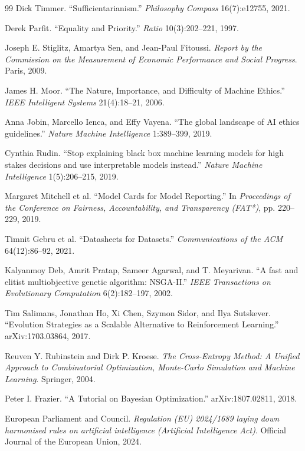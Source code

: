\documentclass[11pt,a4paper]{article}
\begin{document}
\begin{thebibliography}{99}
 Dick Timmer. ``Sufficientarianism.'' \emph{Philosophy
Compass} 16(7):e12755, 2021.

 Derek Parfit. ``Equality and Priority.'' \emph{Ratio}
10(3):202--221, 1997.

 Joseph E. Stiglitz, Amartya Sen, and Jean-Paul
Fitoussi. \emph{Report by the Commission on the Measurement of Economic
Performance and Social Progress}. Paris, 2009.

 James H. Moor. ``The Nature, Importance, and Difficulty of
Machine Ethics.'' \emph{IEEE Intelligent Systems} 21(4):18--21, 2006.

 Anna Jobin, Marcello Ienca, and Effy Vayena. ``The global
landscape of AI ethics guidelines.'' \emph{Nature Machine Intelligence}
1:389--399, 2019.

 Cynthia Rudin. ``Stop explaining black box machine
learning models for high stakes decisions and use interpretable models
instead.'' \emph{Nature Machine Intelligence} 1(5):206--215, 2019.

 Margaret Mitchell et al. ``Model Cards for Model
Reporting.'' In \emph{Proceedings of the Conference on Fairness,
Accountability, and Transparency (FAT*)}, pp. 220--229, 2019.

 Timnit Gebru et al. ``Datasheets for Datasets.''
\emph{Communications of the ACM} 64(12):86--92, 2021.

 Kalyanmoy Deb, Amrit Pratap, Sameer Agarwal, and T.
Meyarivan. ``A fast and elitist multiobjective genetic algorithm: NSGA-II.''
\emph{IEEE Transactions on Evolutionary Computation} 6(2):182--197, 2002.

 Tim Salimans, Jonathan Ho, Xi Chen, Szymon Sidor, and
Ilya Sutskever. ``Evolution Strategies as a Scalable Alternative to
Reinforcement Learning.'' arXiv:1703.03864, 2017.

 Reuven Y. Rubinstein and Dirk P. Kroese. \emph{The
Cross-Entropy Method: A Unified Approach to Combinatorial Optimization,
Monte-Carlo Simulation and Machine Learning}. Springer, 2004.

 Peter I. Frazier. ``A Tutorial on Bayesian
Optimization.'' arXiv:1807.02811, 2018.

 European Parliament and Council. \emph{Regulation (EU)
2024/1689 laying down harmonised rules on artificial intelligence (Artificial
Intelligence Act)}. Official Journal of the European Union, 2024.

\end{thebibliography}
\end{document}

